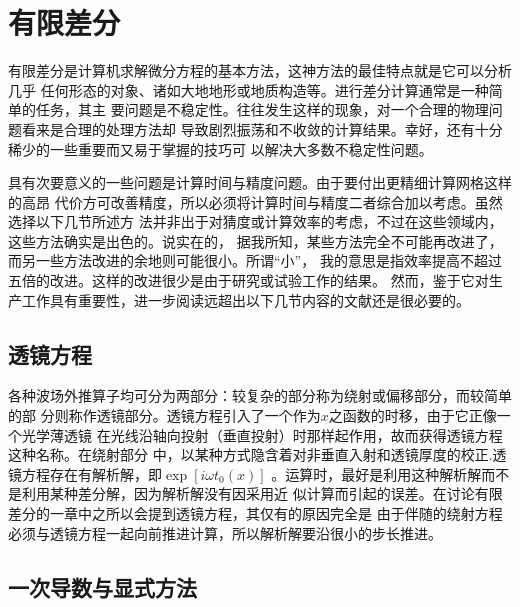 \section{有限差分}
\label{sec:2.2}

有限差分是计算机求解微分方程的基本方法，这神方法的最佳特点就是它可以分析几乎
任何形态的对象、诸如大地地形或地质构造等。进行差分计算通常是一种简单的任务，其主
要问题是不稳定性。往往发生这样的现象，对一个合理的物理问题看来是合理的处理方法却
导致剧烈振荡和不收敛的计算结果。幸好，还有十分稀少的一些重要而又易于掌握的技巧可
以解决大多数不稳定性问题。

具有次要意义的一些问题是计算时间与精度问题。由于要付出更精细计算网格这样的高昂
代价方可改善精度，所以必须将计算时间与精度二者综合加以考虑。虽然选择以下几节所述方
法并非出于对猜度或计算效率的考虑，不过在这些领域内，这些方法确实是出色的。说实在的，
据我所知，某些方法完全不可能再改进了，而另一些方法改进的余地则可能很小。所谓“小”，
我的意思是指效率提高不超过五倍的改进。这样的改进很少是由于研究或试验工作的结果。
然而，鉴于它对生产工作具有重要性，进一步阅读远超出以下几节内容的文献还是很必要的。

\subsection{透镜方程}
\label{sec:2.2.1}

各种波场外推算子均可分为两部分：较复杂的部分称为绕射或偏移部分，而较简单的部
分则称作透镜部分。透镜方程引入了一个作为$x$之函数的时移，由于它正像一个光学薄透镜
在光线沿轴向投射（垂直投射）时那样起作用，故而获得透镜方程这种名称。在绕射部分
中，以某种方式隐含着对非垂直入射和透镜厚度的校正.透镜方程存在有解析解，即$\exp[i\omega t_0(x)]$
。运算时，最好是利用这种解析解而不是利用某种差分解，因为解析解没有因采用近
似计算而引起的误差。在讨论有限差分的一章中之所以会提到透镜方程，其仅有的原因完全是
由于伴随的绕射方程必须与透镜方程一起向前推进计算，所以解析解要沿很小的步长推进。

\subsection{一次导数与显式方法}
\label{sec:2.2.2}

